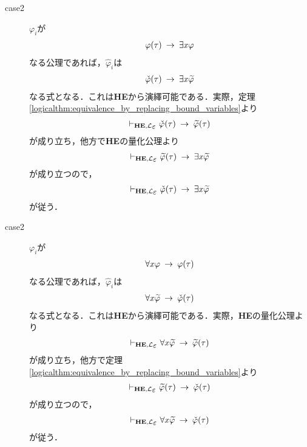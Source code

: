 \begin{metaprf}
\begin{description}
			\item[case2] $\varphi_{i}$が
				\begin{align}
					\varphi(\tau) \hspace{0.25em}\rightarrow\hspace{0.25em} \exists x \varphi
				\end{align}
				なる公理であれば，$\widehat{\varphi}_{i}$は
				\begin{align}
					\check{\varphi}(\tau) \hspace{0.25em}\rightarrow\hspace{0.25em} \exists x \widetilde{\varphi}
				\end{align}
				なる式となる．これは{\bf HE}から演繹可能である．実際，定理\ref{logicalthm:equivalence_by_replacing_bound_variables}より
				\begin{align}
					\provable{\mbox{{\bf HE}},\lang{\varepsilon}} \check{\varphi}(\tau) \rarrow \widetilde{\varphi}(\tau)
				\end{align}
				が成り立ち，他方で{\bf HE}の量化公理より
				\begin{align}
					\provable{\mbox{{\bf HE}},\lang{\varepsilon}} \widetilde{\varphi}(\tau) \rarrow \exists x \widetilde{\varphi}
				\end{align}
				が成り立つので，
				\begin{align}
					\provable{\mbox{{\bf HE}},\lang{\varepsilon}} \check{\varphi}(\tau) \rarrow \exists x \widetilde{\varphi}
				\end{align}
				が従う．
				
			\item[case2] $\varphi_{i}$が
				\begin{align}
					\forall x \varphi \hspace{0.25em}\rightarrow\hspace{0.25em} \varphi(\tau)
				\end{align}
				なる公理であれば，$\widehat{\varphi}_{i}$は
				\begin{align}
					\forall x \widetilde{\varphi} \hspace{0.25em}\rightarrow\hspace{0.25em} \check{\varphi}(\tau)
				\end{align}
				なる式となる．これは{\bf HE}から演繹可能である．実際，{\bf HE}の量化公理より
				\begin{align}
					\provable{\mbox{{\bf HE}},\lang{\varepsilon}} \forall x \widetilde{\varphi} \rarrow \widetilde{\varphi}(\tau)
				\end{align}
				が成り立ち，他方で定理\ref{logicalthm:equivalence_by_replacing_bound_variables}より
				\begin{align}
					\provable{\mbox{{\bf HE}},\lang{\varepsilon}} \widetilde{\varphi}(\tau) \rarrow \check{\varphi}(\tau)
				\end{align}
				が成り立つので，
				\begin{align}
					\provable{\mbox{{\bf HE}},\lang{\varepsilon}} \forall x \widetilde{\varphi} \rarrow \check{\varphi}(\tau)
				\end{align}
				が従う．
				

\end{description}
\end{metaprf}
